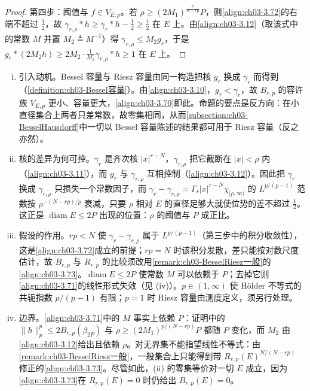 \documentclass[../../main.tex]{subfiles}%
\begin{document}
\begin{proof}
第四步：阈值与 $f\in V_{E,p}$。若 $\rho\geqslant(2M_1)^{\frac p{N-rp}}P$，则\eqref{align:ch03-3.72}的右端不超过 $\frac12$，故 $\gamma_{r,\rho}*h\geqslant\gamma_r*h-\frac12\geqslant\frac12$ 在 $E$ 上。由\eqref{align:ch03-3.12}（取该式中的常数 $M$ 并置 $M_2\triangleq M^{-1}$）得 $\gamma_{r,\rho}\leqslant M_2g_r$，于是 $g_r*(2M_2h)\geqslant2M_2\cdot\frac{1}{M_2}\gamma_{r,\rho}*h\geqslant1$ 在 $E$ 上。
\end{proof}

\begin{remark}\label{remark:ch03-BesselRiesz动机}
\begin{enumerate}[(i)]
\item 引入动机。Bessel 容量与 Riesz 容量由同一构造把核 $g_r$ 换成 $\gamma_r$ 而得到（\cref{definition:ch03-Bessel容量}）。由\eqref{align:ch03-3.10}，$g_r<\gamma_r$，故 $B_{r,p}$ 的容许族 $V_{E,p}$ 更小、容量更大，\eqref{align:ch03-3.70}即此。命题的要点是反方向：在小直径集合上两者只差常数，故零集相同，从而\cref{subsection:ch03-BesselHausdorff}中一切以 Bessel 容量陈述的结果都可用于 Riesz 容量（反之亦然）。
\item 核的差异为何可控。$\gamma_r$ 是齐次核 $|x|^{r-N}$，$\gamma_{r,\rho}$ 把它截断在 $|x|<\rho$ 内（\eqref{align:ch03-3.11}），而 $g_r$ 与 $\gamma_{r,\rho}$ 互相控制（\eqref{align:ch03-3.12}）。因此把 $\gamma_r$ 换成 $\gamma_{r,\rho}$ 只损失一个常数因子，而 $\gamma_r-\gamma_{r,\rho}=\Gamma_r|x|^{r-N}\chi_{[\rho,\infty)}$ 的 $L^{p/(p-1)}$ 范数按 $\rho^{-(N-rp)/p}$ 衰减，只要 $\rho$ 相对 $E$ 的直径足够大就使位势的差不超过 $\frac12$。这正是 $\operatorname{diam}E\leqslant2P$ 出现的位置：$\rho$ 的阈值与 $P$ 成正比。
\item 假设的作用。$rp<N$ 使 $\gamma_r-\gamma_{r,\rho}$ 属于 $L^{p/(p-1)}$（第三步中的积分收敛性），这是\eqref{align:ch03-3.72}成立的前提；$rp=N$ 时该积分发散，差只能按对数尺度估计，故 $B_{r,p}$ 与 $R_{r,p}$ 的比较须改用\cref{remark:ch03-BesselRiesz一般}的\eqref{align:ch03-3.73}。$\operatorname{diam}E\leqslant2P$ 使常数 $M$ 可以依赖于 $P$；去掉它则\eqref{align:ch03-3.71}的线性形式失效（见 (iv)）。$p\in(1,\infty)$ 使 Hölder 不等式的共轭指数 $p/(p-1)$ 有限；$p=1$ 时 Riesz 容量由测度定义，须另行处理。
\item 边界。\eqref{align:ch03-3.71}中的 $M$ 事实上依赖 $P$：证明中的 $\|h\|_p^p\leqslant2B_{r,p}(\beta_{2P})$ 与 $\rho\geqslant(2M_1)^{p/(N-rp)}P$ 都随 $P$ 变化，而 $M_2$ 由\eqref{align:ch03-3.12}给出且依赖 $\rho$。对无界集不能指望线性不等式：由\cref{remark:ch03-BesselRiesz一般}，一般集合上只能得到带 $R_{r,p}(E)^{N/(N-rp)}$ 修正的\eqref{align:ch03-3.73}。尽管如此，(ii) 的零集等价对一切 $E$ 成立，因为\eqref{align:ch03-3.73}在 $R_{r,p}(E)=0$ 时仍给出 $B_{r,p}(E)=0$。
\end{enumerate}
\end{remark}
\end{document}

